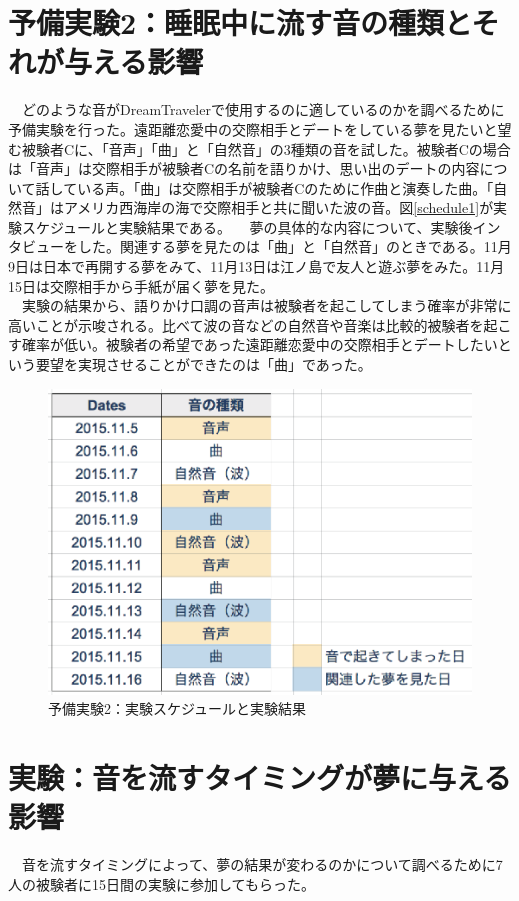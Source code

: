 \section{予備実験2：睡眠中に流す音の種類とそれが与える影響}
　どのような音がDreamTravelerで使用するのに適しているのかを調べるために予備実験を行った。遠距離恋愛中の交際相手とデートをしている夢を見たいと望む被験者Cに、「音声」「曲」と「自然音」の3種類の音を試した。被験者Cの場合は「音声」は交際相手が被験者Cの名前を語りかけ、思い出のデートの内容について話している声。「曲」は交際相手が被験者Cのために作曲と演奏した曲。「自然音」はアメリカ西海岸の海で交際相手と共に聞いた波の音。図\ref{schedule1}が実験スケジュールと実験結果である。
　夢の具体的な内容について、実験後インタビューをした。関連する夢を見たのは「曲」と「自然音」のときである。11月9日は日本で再開する夢をみて、11月13日は江ノ島で友人と遊ぶ夢をみた。11月15日は交際相手から手紙が届く夢を見た。\\
　実験の結果から、語りかけ口調の音声は被験者を起こしてしまう確率が非常に高いことが示唆される。比べて波の音などの自然音や音楽は比較的被験者を起こす確率が低い。被験者の希望であった遠距離恋愛中の交際相手とデートしたいという要望を実現させることができたのは「曲」であった。

\begin{figure}[htbp]
\begin{center}
\includegraphics[width=13cm]{eps/schedule1.eps}
\caption{予備実験2：実験スケジュールと実験結果}
\label{schedule}
\end{center}
\end{figure}

\section{実験：音を流すタイミングが夢に与える影響}
　音を流すタイミングによって、夢の結果が変わるのかについて調べるために7人の被験者に15日間の実験に参加してもらった。


